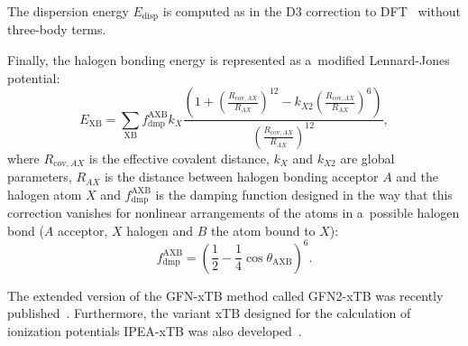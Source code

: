 The dispersion energy $E_{\text{disp}}$ is computed as in the D3 correction to DFT~\cite{grimme-d3} without three-body terms.

Finally, the halogen bonding energy is represented as a~modified Lennard-Jones potential:
\begin{equation}
    E_{\text{XB}} = \sum_{\text{XB}} f_{\text{dmp}}^{\text{AXB}} k_X \frac{\left( 1 + \left( \frac{R_{\text{cov}, AX}}{R_{AX}} \right)^{12} - k_{X2} \left( \frac{R_{\text{cov}, AX}}{R_{AX}} \right)^{6} \right)}{\left( \frac{R_{\text{cov}, AX}}{R_{AX}} \right)^{12}},
\end{equation}
where $R_{\text{cov},AX}$ is the effective covalent distance, $k_X$ and $k_{X2}$ are global parameters, $R_{AX}$ is the distance between halogen bonding acceptor $A$ and the halogen atom $X$ and $f_{\text{dmp}}^{\text{AXB}}$ is the damping function designed in the way that this correction vanishes for nonlinear arrangements of the atoms in a~possible halogen bond ($A$ acceptor, $X$ halogen and $B$ the atom bound to $X$):
\begin{equation}
    f_{\text{dmp}}^{\text{AXB}} = \left( \frac{1}{2} - \frac{1}{4} \cos{\theta_{\text{AXB}}} \right)^6.
\end{equation}

The extended version of the GFN-xTB method called GFN2-xTB was recently published~\cite{gfn-2}. Furthermore, the variant xTB designed for the calculation of ionization potentials IPEA-xTB was also developed~\cite{ipea}.